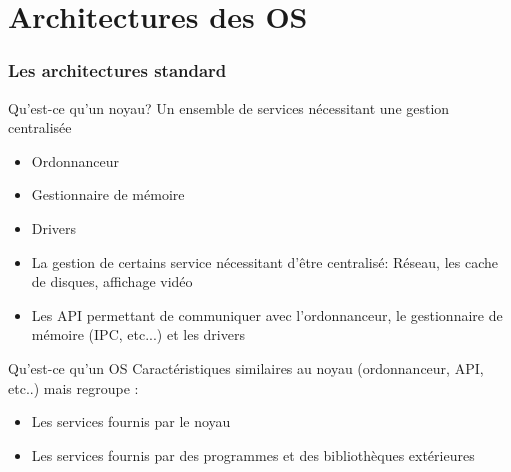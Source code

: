 \part{Architectures des OS}

\begin{frame}
\partpage
\end{frame}

\begin{frame}
\tableofcontents[currentpart]
\end{frame}
\section{Les architectures standard}

\begin{frame}[fragile=singleslide]{Qu'est-ce qu'un noyau?}
  Un ensemble de services nécessitant une gestion centralisée
  \begin{itemize} 
  \item Ordonnanceur
  \item Gestionnaire de mémoire
  \item Drivers
  \item La gestion de  certains service nécessitant d'être centralisé:
    Réseau, les cache de disques, affichage vidéo
  \item  Les API  permettant  de communiquer  avec l'ordonnanceur,  le
    gestionnaire de mémoire (IPC, etc...) et les drivers
  \end{itemize} 
\end{frame} 

\begin{frame}[fragile=singleslide]{Qu'est-ce qu'un OS}
  Caractéristiques similaires au noyau (ordonnanceur, API, etc..) mais
  regroupe :
  \begin{itemize} 
  \item Les services fournis par le noyau
  \item Les  services fournis par des programmes  et des bibliothèques
    extérieures
  \end{itemize} 
\end{frame}

